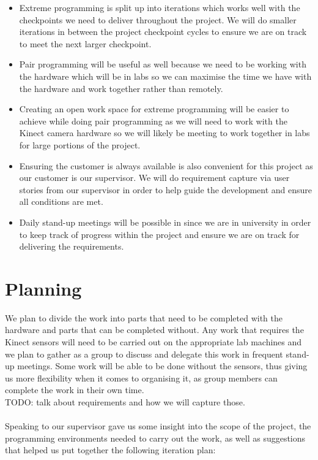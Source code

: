\documentclass[a4paper,12pt]{article}
\begin{document}
\begin{itemize}
\item Extreme programming is split up into iterations which works well with the checkpoints we need to deliver throughout the project. We will do smaller iterations in between the project checkpoint cycles to ensure we are on track to meet the next larger checkpoint.
\item Pair programming will be useful as well because we need to be working with the hardware which will be in labs so we can maximise the time we have with the hardware and work together rather than remotely.
\item Creating an open work space for extreme programming will be easier to achieve while doing pair programming as we will need to work with the Kinect camera hardware so we will likely be meeting to work together in labs for large portions of the project.
\item Ensuring the customer is always available is also convenient for this project as our customer is our supervisor. We will do requirement capture via user stories from our supervisor in order to help guide the development and ensure all conditions are met.
\item Daily stand-up meetings will be possible in since we are in university in order to keep track of progress within the project and ensure we are on track for delivering the requirements.
\end{itemize}

\section*{Planning}
We plan to divide the work into parts that need to be completed with the hardware and parts that can be completed without. Any work that requires the Kinect sensors will need to be carried out on the appropriate lab machines and we plan to gather as a group to discuss and delegate this work in frequent stand-up meetings. Some work will be able to be done without the sensors, thus giving us more flexibility when it comes to organising it, as group members can complete the work in their own time. \\

TODO: talk about requirements and how we will capture those. \\
\\
Speaking to our supervisor gave us some insight into the scope of the project, the programming environments needed to carry out the work, as well as suggestions that helped us put together the following iteration plan:
\end{document}
